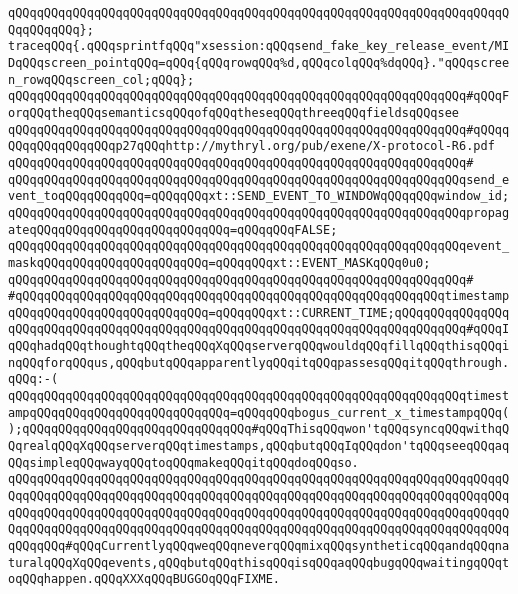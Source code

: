 \verb|qQQqqQQqqQQqqQQqqQQqqQQqqQQqqQQqqQQqqQQqqQQqqQQqqQQqqQQqqQQqqQQqqQQqqQQqqQQqqQQq};|\newline
\newline
\verb|traceqQQq{.qQQqsprintfqQQq"xsession:qQQqsend_fake_key_release_event/MIDqQQqscreen_pointqQQq=qQQq{qQQqrowqQQq%d,qQQqcolqQQq%dqQQq}."qQQqscreen_rowqQQqscreen_col;qQQq};|\newline
\verb|qQQqqQQqqQQqqQQqqQQqqQQqqQQqqQQqqQQqqQQqqQQqqQQqqQQqqQQqqQQqqQQq#qQQqForqQQqtheqQQqsemanticsqQQqofqQQqtheseqQQqthreeqQQqfieldsqQQqsee|\newline
\verb|qQQqqQQqqQQqqQQqqQQqqQQqqQQqqQQqqQQqqQQqqQQqqQQqqQQqqQQqqQQqqQQq#qQQqqQQqqQQqqQQqqQQqp27qQQqhttp://mythryl.org/pub/exene/X-protocol-R6.pdf|\newline
\verb|qQQqqQQqqQQqqQQqqQQqqQQqqQQqqQQqqQQqqQQqqQQqqQQqqQQqqQQqqQQqqQQq#|\newline
\verb|qQQqqQQqqQQqqQQqqQQqqQQqqQQqqQQqqQQqqQQqqQQqqQQqqQQqqQQqqQQqqQQqsend_event_toqQQqqQQqqQQq=qQQqqQQqxt::SEND_EVENT_TO_WINDOWqQQqqQQqwindow_id;|\newline
\verb|qQQqqQQqqQQqqQQqqQQqqQQqqQQqqQQqqQQqqQQqqQQqqQQqqQQqqQQqqQQqqQQqpropagateqQQqqQQqqQQqqQQqqQQqqQQqqQQq=qQQqqQQqFALSE;|\newline
\verb|qQQqqQQqqQQqqQQqqQQqqQQqqQQqqQQqqQQqqQQqqQQqqQQqqQQqqQQqqQQqqQQqevent_maskqQQqqQQqqQQqqQQqqQQqqQQq=qQQqqQQqxt::EVENT_MASKqQQq0u0;|\newline
\verb|qQQqqQQqqQQqqQQqqQQqqQQqqQQqqQQqqQQqqQQqqQQqqQQqqQQqqQQqqQQqqQQq#|\newline
\verb|#qQQqqQQqqQQqqQQqqQQqqQQqqQQqqQQqqQQqqQQqqQQqqQQqqQQqqQQqqQQqtimestampqQQqqQQqqQQqqQQqqQQqqQQqqQQq=qQQqqQQqxt::CURRENT_TIME;qQQqqQQqqQQqqQQqqQQqqQQqqQQqqQQqqQQqqQQqqQQqqQQqqQQqqQQqqQQqqQQqqQQqqQQqqQQqqQQq#qQQqIqQQqhadqQQqthoughtqQQqtheqQQqXqQQqserverqQQqwouldqQQqfillqQQqthisqQQqinqQQqforqQQqus,qQQqbutqQQqapparentlyqQQqitqQQqpassesqQQqitqQQqthrough.qQQq:-(|\newline
\verb|qQQqqQQqqQQqqQQqqQQqqQQqqQQqqQQqqQQqqQQqqQQqqQQqqQQqqQQqqQQqqQQqtimestampqQQqqQQqqQQqqQQqqQQqqQQqqQQq=qQQqqQQqbogus_current_x_timestampqQQq();qQQqqQQqqQQqqQQqqQQqqQQqqQQqqQQq#qQQqThisqQQqwon'tqQQqsyncqQQqwithqQQqrealqQQqXqQQqserverqQQqtimestamps,qQQqbutqQQqIqQQqdon'tqQQqseeqQQqaqQQqsimpleqQQqwayqQQqtoqQQqmakeqQQqitqQQqdoqQQqso.|\newline
\verb|qQQqqQQqqQQqqQQqqQQqqQQqqQQqqQQqqQQqqQQqqQQqqQQqqQQqqQQqqQQqqQQqqQQqqQQqqQQqqQQqqQQqqQQqqQQqqQQqqQQqqQQqqQQqqQQqqQQqqQQqqQQqqQQqqQQqqQQqqQQqqQQqqQQqqQQqqQQqqQQqqQQqqQQqqQQqqQQqqQQqqQQqqQQqqQQqqQQqqQQqqQQqqQQqqQQqqQQqqQQqqQQqqQQqqQQqqQQqqQQqqQQqqQQqqQQqqQQqqQQqqQQqqQQqqQQqqQQqqQQqqQQqqQQq#qQQqCurrentlyqQQqweqQQqneverqQQqmixqQQqsyntheticqQQqandqQQqnaturalqQQqXqQQqevents,qQQqbutqQQqthisqQQqisqQQqaqQQqbugqQQqwaitingqQQqtoqQQqhappen.qQQqXXXqQQqBUGGOqQQqFIXME.|\newline
